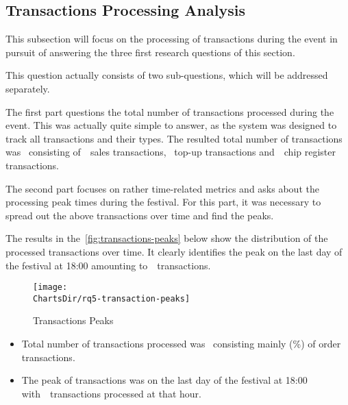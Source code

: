 
\subsection{Transactions Processing Analysis}
\label{subsec:analysis-performance-indicators-transactions}

This subsection will focus on the processing of transactions during the event in pursuit of answering the three first research questions of this section.


This question actually consists of two sub-questions, which will be addressed separately.

The first part questions the total number of transactions processed during the event.
This was actually quite simple to answer, as the system was designed to track all transactions and their types.
The resulted total number of transactions was~ consisting of~~sales transactions, ~top-up transactions and~~chip register transactions.

The second part focuses on rather time-related metrics and asks about the processing peak times during the festival.
For this part, it was necessary to spread out the above transactions over time and find the peaks.

The results in the~\autoref{fig:transactions-peaks} below show the distribution of the processed transactions over time.
It clearly identifies the peak on the last day of the festival at 18:00 amounting to~~transactions.

\begin{figure}[H]
	\centering
	\texttt{[image: \\ChartsDir/rq5-transaction-peaks]}
	\caption{ Transactions Peaks}
	\label{fig:transactions-peaks}
	\source
\end{figure}

\begin{keytakeaways}
	\begin{itemize}
		\item Total number of transactions processed was~ consisting mainly (\%) of order transactions.
		\item The peak of transactions was on the last day of the festival at 18:00 with~~transactions processed at that hour.
	\end{itemize}
\end{keytakeaways}

